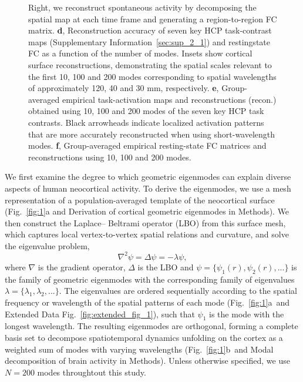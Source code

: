 \documentclass[sn-mathphys-num]{sn-jnl}%
\theoremstyle{thmstyleone}%
\theoremstyle{thmstyletwo}%
\theoremstyle{thmstylethree}%
\begin{document}
\begin{figure}[!htb]
{	Right, we reconstruct spontaneous activity by decomposing the spatial map at each time frame and generating a region-to-region FC matrix.
	\textbf{d}, Reconstruction accuracy of seven key HCP task-contrast maps (Supplementary Information~\ref{sec:sup_2_1}) and restingstate FC as a function of the number of modes. 
	Insets show cortical surface reconstructions, demonstrating the spatial scales relevant to the first 10, 100 and 200 modes corresponding to spatial wavelengths of approximately 120, 40 and 30 mm, respectively.
	\textbf{e}, Group-averaged empirical task-activation maps and reconstructions (recon.) obtained using 10, 100 and 200 modes of the seven key HCP task contrasts. 
	Black arrowheads indicate localized activation patterns that are more accurately reconstructed when using short-wavelength modes. 
	\textbf{f}, Group-averaged empirical resting-state FC matrices and reconstructions using 10, 100 and 200 modes.
	} \label{fig:fig_3}
\end{figure}

We first examine the degree to which geometric eigenmodes can explain diverse aspects of human neocortical activity. 
To derive the eigenmodes, we use a mesh representation of a population-averaged template of the neocortical surface (Fig.~\ref{fig:1}a and Derivation of cortical geometric eigenmodes in Methods). 
We then construct the Laplace– Beltrami operator (LBO) from this surface mesh, which captures local vertex-to-vertex spatial relations and curvature, and solve the eigenvalue problem,
\begin{equation} \label{eq:1}
	\nabla^2 \psi = \Delta\psi = -\lambda \psi,
\end{equation}
where $ \nabla $ is the gradient operator, $ \Delta $ is the LBO and $ \psi = \{\psi_1(r), \psi_2(r),...\} $ is the family of geometric eigenmodes with the corresponding family of eigenvalues $ \lambda = \{ \lambda_1, \lambda_2, ... \} $. 
The eigenvalues are ordered sequentially according to the spatial frequency or wavelength of the spatial patterns of each mode (Fig.~\ref{fig:1}a~and Extended Data Fig.~\ref{fig:extended_fig_1}), such that $ \psi_1 $ is the mode with the longest wavelength. 
The resulting eigenmodes are orthogonal, forming a complete basis set to decompose spatiotemporal dynamics unfolding on the cortex as a weighted sum of modes with varying wavelengths (Fig.~\ref{fig:1}b~and Modal decomposition of brain activity in Methods).
Unless otherwise specified, we use $ N=200 $ modes throughtout this study.
\end{document}
